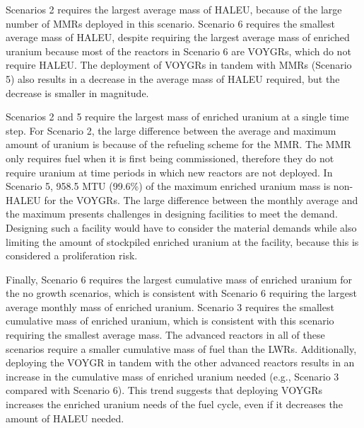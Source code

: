 Scenarios 2 requires the largest average mass of \gls{HALEU}, because 
of the large number of \glspl{MMR} deployed in this scenario. Scenario 
6 requires the smallest average mass of \gls{HALEU}, despite requiring the 
largest average mass of enriched uranium because most of the 
reactors in Scenario 6 are VOYGRs, which do not require \gls{HALEU}. 
The deployment 
of VOYGRs in tandem with \glspl{MMR} (Scenario 5) also results in a 
decrease in the average 
mass of \gls{HALEU} required, but the decrease is smaller in magnitude. 

Scenarios 2 and 5 require the largest mass of enriched uranium at a single 
time step. For Scenario 2, the large difference between the average and 
maximum amount of uranium is because of the refueling scheme for the 
\gls{MMR}. The \gls{MMR} only requires fuel when it is first being 
commissioned, therefore they do not require uranium at time periods in 
which
new reactors are not deployed. In Scenario 5, 958.5 MTU (99.6\%) of the 
maximum enriched uranium 
mass is non-\gls{HALEU} for the VOYGRs. The large difference between the 
monthly average and the maximum presents challenges in designing facilities 
to meet the demand. Designing such a facility would have to consider the 
material demands while also limiting the amount of stockpiled enriched 
uranium at the facility, because this is considered a proliferation risk. 

Finally, Scenario 6 requires the largest cumulative mass of enriched uranium 
for the no growth scenarios, which is consistent with Scenario 6 requiring 
the largest average monthly mass of enriched uranium.  Scenario 3 requires the 
smallest cumulative 
mass of enriched uranium, which is consistent with this scenario requiring 
the smallest average mass. The advanced reactors 
in all of these scenarios require a smaller cumulative mass of fuel than 
the \glspl{LWR}. Additionally, deploying the VOYGR in tandem with the other 
advanced reactors results in an increase in the cumulative mass 
of enriched uranium needed (e.g., Scenario 3 compared with Scenario 6). This
trend suggests that deploying VOYGRs increases the enriched uranium needs 
of the fuel cycle, even if it decreases the amount of \gls{HALEU} needed. 

